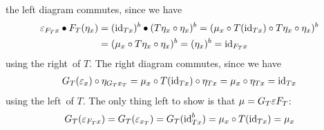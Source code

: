 \begin{beweis}
\begin{itemize1}
\begin{figure}[H]
\begin{subfigure}{0.4\textwidth}
    \centering
    \end{subfigure}
    \hspace{2em}
    \begin{subfigure}{0.4\textwidth}
    \centering
    \end{subfigure}
    \end{figure}
    the left diagram commutes, since we have
    \begin{align*}
        \varepsilon_{F_Tx} \bullet F_T(\eta_x) &= (\operatorname{id}_{Tx})^b \bullet (T\eta_x \circ \eta_x)^b 
        = (\mu_x \circ T(\operatorname{id}_{Tx}) \circ T\eta_x \circ \eta_x)^b \\
        &= (\mu_x \circ T\eta_x \circ \eta_x)^b  
        = (\eta_x)^b = \operatorname{id}_{F_Tx}
    \end{align*}
    using the right~ of $T$.
    The right diagram commutes, since we have
    \begin{align*}
        G_T(\varepsilon_x) \circ \eta_{G_Tx_T} = \mu_x \circ T(\operatorname{id}_{Tx}) \circ \eta_{Tx}
        = \mu_x \circ \eta_{Tx} = \operatorname{id}_{Tx}
    \end{align*}
    using the left~ of $T$. The only thing left to show is that
    $\mu = G_T \varepsilon F_T$:
    \begin{align*}
        G_T(\varepsilon_{F_Tx}) = G_T(\varepsilon_{x_T}) = G_T(\operatorname{id}_{Tx}^b) = \mu_x \circ T(\operatorname{id}_{Tx}) = \mu_x
    \end{align*}
    \end{itemize1}
\end{beweis}
\newpage
